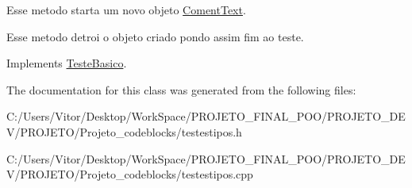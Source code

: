 Esse metodo starta um novo objeto \hyperlink{class_coment_text}{Coment\-Text}. 

Esse metodo detroi o objeto criado pondo assim fim ao teste. 

Implements \hyperlink{class_teste_basico_a9801730ac8a0acc39a901a179aa91e97}{Teste\-Basico}.



The documentation for this class was generated from the following files\-:\begin{DoxyCompactItemize}
\item 
C\-:/\-Users/\-Vitor/\-Desktop/\-Work\-Space/\-P\-R\-O\-J\-E\-T\-O\-\_\-\-F\-I\-N\-A\-L\-\_\-\-P\-O\-O/\-P\-R\-O\-J\-E\-T\-O\-\_\-\-D\-E\-V/\-P\-R\-O\-J\-E\-T\-O/\-Projeto\-\_\-codeblocks/testestipos.\-h\item 
C\-:/\-Users/\-Vitor/\-Desktop/\-Work\-Space/\-P\-R\-O\-J\-E\-T\-O\-\_\-\-F\-I\-N\-A\-L\-\_\-\-P\-O\-O/\-P\-R\-O\-J\-E\-T\-O\-\_\-\-D\-E\-V/\-P\-R\-O\-J\-E\-T\-O/\-Projeto\-\_\-codeblocks/testestipos.\-cpp\end{DoxyCompactItemize}
